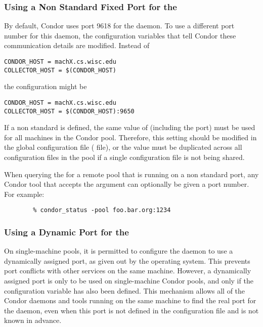 \subsubsection{\label{sec:Ports-NonStandard}Using 
a Non Standard Fixed Port for the }
By default,
Condor uses port 9618 for the  daemon.
To use a different port number for this daemon,
the configuration variables that tell Condor these communication
details are modified.
Instead of
\begin{verbatim}
CONDOR_HOST = machX.cs.wisc.edu
COLLECTOR_HOST = $(CONDOR_HOST)
\end{verbatim}
the configuration might be
\begin{verbatim}
CONDOR_HOST = machX.cs.wisc.edu
COLLECTOR_HOST = $(CONDOR_HOST):9650
\end{verbatim}

If a non standard is defined, the same value of
 (including the port) must be used for all
machines in the Condor pool.
Therefore, this setting should be modified in the global
configuration file ( file),
or the value must be duplicated across
all configuration files in the pool if a single configuration file
is not being shared.

When querying the  for a remote pool that is running
on a non standard port, any Condor tool that accepts the 
argument can optionally be given a port number.  For example:
\footnotesize
\begin{verbatim}
        % condor_status -pool foo.bar.org:1234
\end{verbatim}
\normalsize


\subsubsection{\label{sec:Ports-Dynamic-Collector}Using 
a Dynamic Port for the }

On single-machine pools, 
it is permitted to configure the
 daemon
to use a dynamically assigned port,
as given out by the operating system.
This prevents port conflicts with other services on the same machine.
However, a dynamically assigned port is only to be used on
single-machine Condor pools,
and only if the
configuration variable has also been defined.
This mechanism allows all of the Condor daemons and tools running on
the same machine to find the real port for the 
daemon,
even when this port is not defined in the
configuration file and is not known in advance.

